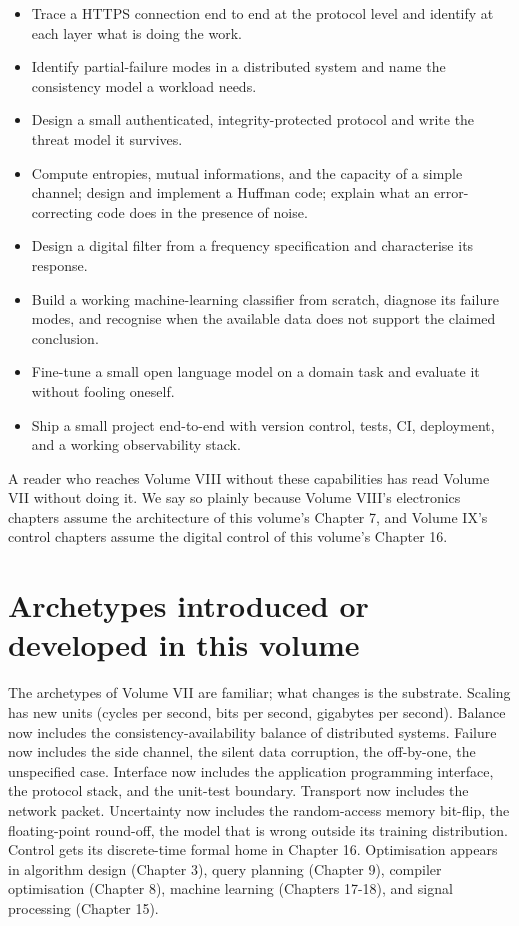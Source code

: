 \begin{itemize}[leftmargin=*]
    queries that exploit indexes; reason about the isolation level
    a workload actually needs.
  \item Trace a HTTPS connection end to end at the protocol level
    and identify at each layer what is doing the work.
  \item Identify partial-failure modes in a distributed system and
    name the consistency model a workload needs.
  \item Design a small authenticated, integrity-protected protocol
    and write the threat model it survives.
  \item Compute entropies, mutual informations, and the capacity of
    a simple channel; design and implement a Huffman code; explain
    what an error-correcting code does in the presence of noise.
  \item Design a digital filter from a frequency specification and
    characterise its response.
  \item Build a working machine-learning classifier from scratch,
    diagnose its failure modes, and recognise when the available
    data does not support the claimed conclusion.
  \item Fine-tune a small open language model on a domain task and
    evaluate it without fooling oneself.
  \item Ship a small project end-to-end with version control,
    tests, CI, deployment, and a working observability stack.
\end{itemize}

A reader who reaches Volume VIII without these capabilities has read Volume VII without doing it. We say so plainly because Volume VIII's electronics chapters assume the architecture of this volume's Chapter 7, and Volume IX's control chapters assume the digital control of this volume's Chapter 16.

\section*{Archetypes introduced or developed in this volume}

The archetypes of Volume VII are familiar; what changes is the substrate. Scaling has new units (cycles per second, bits per second, gigabytes per second). Balance now includes the consistency-availability balance of distributed systems. Failure now includes the side channel, the silent data corruption, the off-by-one, the unspecified case. Interface now includes the application programming interface, the protocol stack, and the unit-test boundary. Transport now includes the network packet. Uncertainty now includes the random-access memory bit-flip, the floating-point round-off, the model that is wrong outside its training distribution. Control gets its discrete-time formal home in Chapter 16. Optimisation appears in algorithm design (Chapter 3), query planning (Chapter 9), compiler optimisation (Chapter 8), machine learning (Chapters 17-18), and signal processing (Chapter 15).

